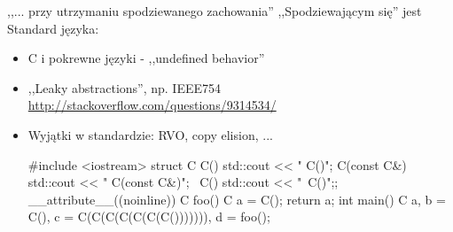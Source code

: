 \begin{frame}{,,... przy utrzymaniu spodziewanego zachowania''}
	,,Spodziewającym się'' jest Standard języka:
	\begin{itemize}
		\item C i pokrewne języki - ,,undefined behavior''
		\item ,,Leaky abstractions'', np. IEEE754 \url{http://stackoverflow.com/questions/9314534/}
		\item Wyjątki w standardzie: RVO, copy elision, ...
			\begin{cpp}
				#include <iostream>
				struct C { C()         {std::cout << " C()\n";}
				           C(const C&) {std::cout << " C(const C&)\n";}
				          ~C()         {std::cout << "~C()\n";}};
				__attribute__((noinline)) C foo() { C a = C(); return a; }
				int main() { C a, b = C(), c = C(C(C(C(C(C(C())))))), d = foo();}

\end{cpp}
\end{itemize}
\end{frame}
